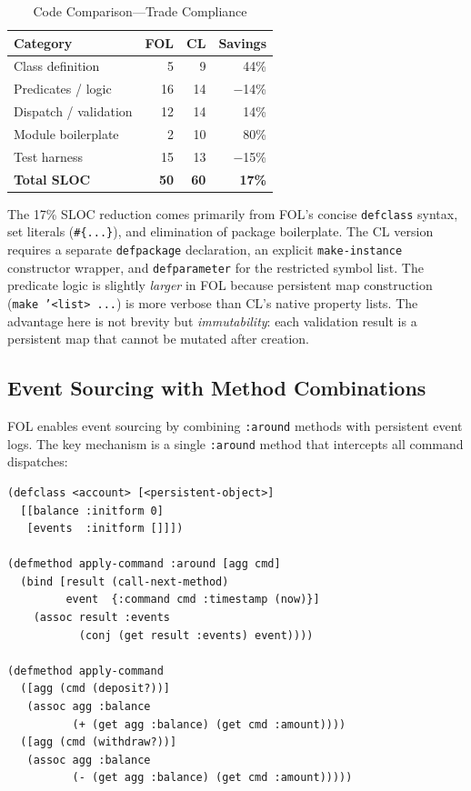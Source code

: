 \documentclass[sigconf,nonacm,review]{acmart}
\begin{document}
\begin{table}[htbp]
\caption{Code Comparison---Trade Compliance}
\label{tab:density}
\small
\begin{tabular}{lrrr}
\toprule
\textbf{Category} & \textbf{FOL} & \textbf{CL} & \textbf{Savings} \\
\midrule
Class definition & 5 & 9 & 44\% \\
Predicates / logic & 16 & 14 & $-$14\% \\
Dispatch / validation & 12 & 14 & 14\% \\
Module boilerplate & 2 & 10 & 80\% \\
Test harness & 15 & 13 & $-$15\% \\
\textbf{Total SLOC} & \textbf{50} & \textbf{60} & \textbf{17\%} \\
\bottomrule
\end{tabular}
\end{table}

The 17\% SLOC reduction comes primarily from FOL's concise \texttt{defclass} syntax, set literals (\texttt{\#\{...\}}), and elimination of package boilerplate. The CL version requires a separate \texttt{defpackage} declaration, an explicit \texttt{make-instance} constructor wrapper, and \texttt{defparameter} for the restricted symbol list. The predicate logic is slightly \textit{larger} in FOL because persistent map construction (\texttt{make '<list> ...}) is more verbose than CL's native property lists. The advantage here is not brevity but \textit{immutability}: each validation result is a persistent map that cannot be mutated after creation.

\subsection{Event Sourcing with Method Combinations}

FOL enables event sourcing by combining \texttt{:around} methods with persistent event logs. The key mechanism is a single \texttt{:around} method that intercepts all command dispatches:

\begin{lstlisting}
(defclass <account> [<persistent-object>]
  [[balance :initform 0]
   [events  :initform []]])

(defmethod apply-command :around [agg cmd]
  (bind [result (call-next-method)
         event  {:command cmd :timestamp (now)}]
    (assoc result :events
           (conj (get result :events) event))))

(defmethod apply-command
  ([agg (cmd (deposit?))]
   (assoc agg :balance
          (+ (get agg :balance) (get cmd :amount))))
  ([agg (cmd (withdraw?))]
   (assoc agg :balance
          (- (get agg :balance) (get cmd :amount)))))
\end{lstlisting}
\end{document}
